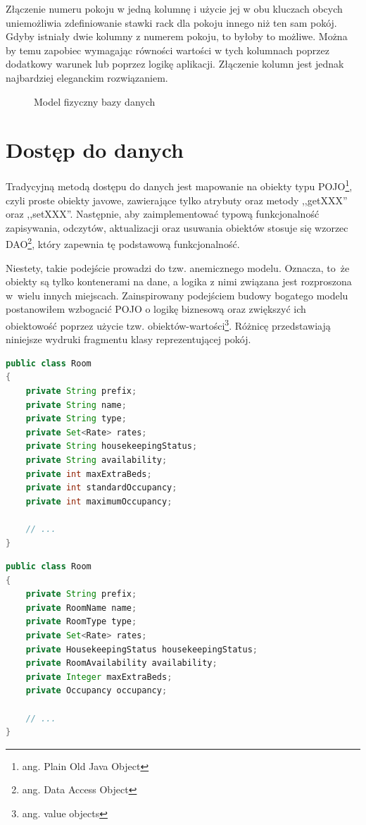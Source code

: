 \documentclass[a4paper,onecolumn,oneside,11pt,wide,floatssmall]{mwrep}
\theoremstyle{definition}
\theoremstyle{plain}%
\theoremstyle{remark}
\begin{document}
Złączenie numeru pokoju w jedną kolumnę i użycie jej w obu kluczach obcych uniemożliwia zdefiniowanie stawki rack dla pokoju innego niż ten sam pokój. Gdyby istniały dwie kolumny z numerem pokoju, to byłoby to możliwe. Można by temu zapobiec wymagając równości wartości w tych kolumnach poprzez dodatkowy warunek lub poprzez logikę aplikacji. Złączenie kolumn jest jednak najbardziej eleganckim rozwiązaniem.

\begin{figure}[H]
  \begin{center}
  \end{center}
  \caption{Model fizyczny bazy danych}
  \label{fig:db-physical-model}
\end{figure}

\section{Dostęp do danych}
Tradycyjną metodą dostępu do danych jest mapowanie na obiekty typu POJO\footnote{ang. Plain Old Java Object}, czyli proste obiekty javowe, zawierające tylko atrybuty oraz metody ,,getXXX'' oraz ,,setXXX''. Następnie, aby zaimplementować typową funkcjonalność zapisywania, odczytów, aktualizacji oraz usuwania obiektów stosuje się wzorzec DAO\footnote{ang. Data Access Object}, który zapewnia tę podstawową funkcjonalność.

Niestety, takie podejście prowadzi do tzw. anemicznego modelu. Oznacza, \mbox{to że} obiekty są tylko kontenerami na dane, a logika z nimi związana jest rozproszona \mbox{w wielu} innych miejscach. Zainspirowany podejściem budowy bogatego modelu \cite{evans2004domain} postanowiłem wzbogacić POJO o logikę biznesową oraz zwiększyć ich obiektowość poprzez użycie tzw. obiektów-wartości\footnote{ang. value objects}. Różnicę przedstawiają niniejsze wydruki fragmentu klasy reprezentującej pokój. 

\begin{lstlisting}[language=Java,style=outcode,caption=POJO]
public class Room
{
    private String prefix; 
    private String name;
    private String type;
    private Set<Rate> rates;
    private String housekeepingStatus;
    private String availability;
    private int maxExtraBeds;
    private int standardOccupancy;
    private int maximumOccupancy;

    // ...
}
\end{lstlisting}

\begin{lstlisting}[language=Java,style=outcode,caption=Agregat zawierający obiekty wartości]
public class Room
{
    private String prefix; 
    private RoomName name;
    private RoomType type;
    private Set<Rate> rates;
    private HousekeepingStatus housekeepingStatus;
    private RoomAvailability availability;
    private Integer maxExtraBeds;
    private Occupancy occupancy;

    // ...
}
\end{lstlisting}
\end{document}
